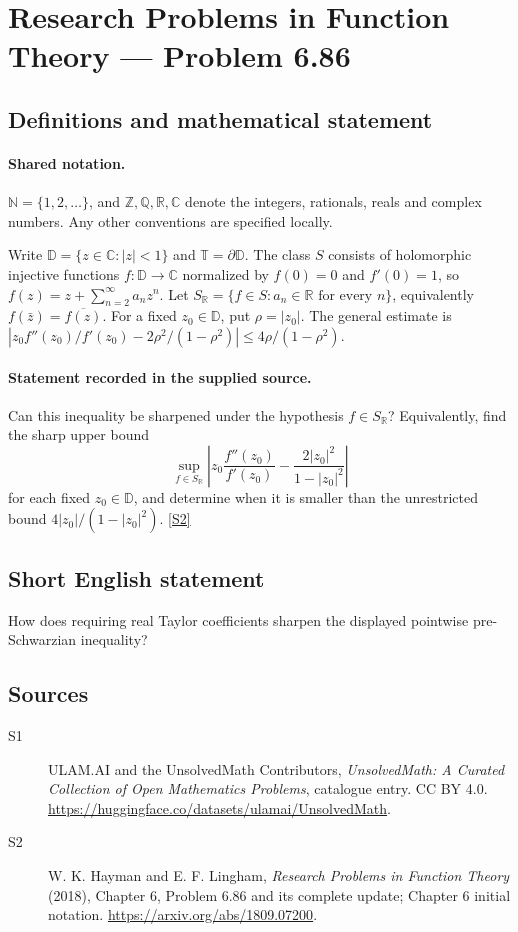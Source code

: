 \documentclass[11pt]{article}
\newcommand{\sref}[2]{\hyperlink{source:#1:#2}{[S#2]}}
\begin{document}
\section{Research Problems in Function Theory — Problem 6.86}\label{statement}

\subsection{Definitions and mathematical statement}

\paragraph{Shared notation.}$\mathbb N=\{1,2,\ldots\}$, and $\mathbb Z,\mathbb Q,\mathbb R,\mathbb C$ denote the integers, rationals, reals and complex numbers. Any other conventions are specified locally.


Write $\mathbb D=\{z\in\mathbb C:|z|<1\}$ and $\mathbb T=\partial\mathbb D$. The class $S$ consists of holomorphic injective functions $f:\mathbb D\to\mathbb C$ normalized by $f(0)=0$ and $f'(0)=1$, so $f(z)=z+\sum_{n=2}^{\infty}a_nz^n$. Let $S_{\mathbb R}=\{f\in S:a_n\in\mathbb R\text{ for every }n\}$, equivalently $f(\bar z)=\overline{f(z)}$. For a fixed $z_0\in\mathbb D$, put $\rho=|z_0|$. The general estimate is $|z_0f''(z_0)/f'(z_0)-2\rho^2/(1-\rho^2)|\le4\rho/(1-\rho^2)$.
\paragraph{Statement recorded in the supplied source.}
Can this inequality be sharpened under the hypothesis $f\in S_{\mathbb R}$? Equivalently, find the sharp upper bound \[\sup_{f\in S_{\mathbb R}}\left|z_0\frac{f''(z_0)}{f'(z_0)}-\frac{2|z_0|^2}{1-|z_0|^2}\right|\] for each fixed $z_0\in\mathbb D$, and determine when it is smaller than the unrestricted bound $4|z_0|/(1-|z_0|^2)$. \sref{statement}{2}
\subsection{Short English statement}
How does requiring real Taylor coefficients sharpen the displayed pointwise pre-Schwarzian inequality?
\subsection{Sources}
\begin{description}
\item[\hypertarget{source:statement:1}{S1}] ULAM.AI and the UnsolvedMath Contributors, \emph{UnsolvedMath: A Curated Collection of Open Mathematics Problems}, catalogue entry. CC BY 4.0. \url{https://huggingface.co/datasets/ulamai/UnsolvedMath}.
\item[\hypertarget{source:statement:2}{S2}] W. K. Hayman and E. F. Lingham, \emph{Research Problems in Function Theory} (2018), Chapter 6, Problem 6.86 and its complete update; Chapter 6 initial notation. \url{https://arxiv.org/abs/1809.07200}.
\end{description}
\label{end:statement}
\end{document}
